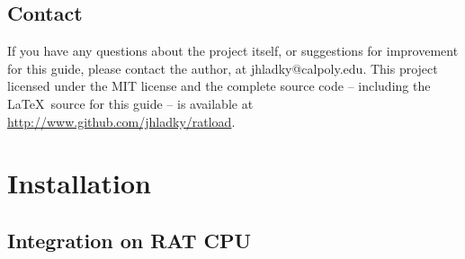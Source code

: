 \documentclass[notitlepage]{article}
\begin{document}
\subsection{Contact}
If you have any questions about the project itself, or suggestions for improvement for this guide, please contact the author, at jhladky@calpoly.edu. This project licensed under the MIT license and the complete source code -- including the \LaTeX ~source for this guide -- is available at \url{http://www.github.com/jhladky/ratload}.




\section{Installation}
\subsection{Integration on RAT CPU}
\end{document}
